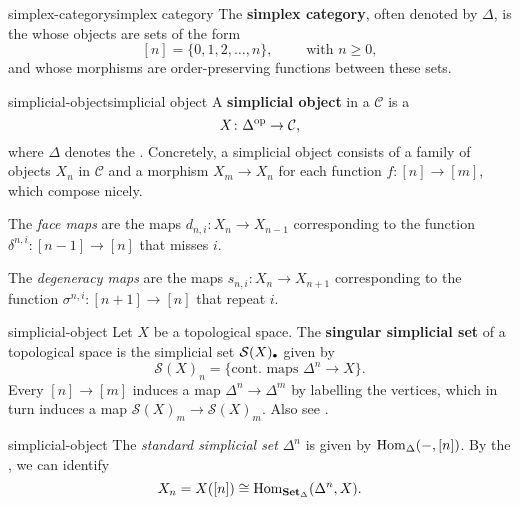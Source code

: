 \begin{topic}{simplex-category}{simplex category}
    The \textbf{simplex category}, often denoted by $\Delta$, is the  whose objects are sets of the form
    \[ [n] = \{ 0, 1, 2, \ldots, n \}, \qquad \text{ with } n \ge 0 , \]
    and whose morphisms are order-preserving functions between these sets.
\end{topic}

\begin{topic}{simplicial-object}{simplicial object}
    A \textbf{simplicial object} in a  $\mathcal{C}$ is a 
    \[ X \colon \Delta^\textup{op} \to \mathcal{C} , \]
    where $\Delta$ denotes the . Concretely, a simplicial object consists of a family of objects $X_n$ in $\mathcal{C}$ and a morphism $X_m \to X_n$ for each function $f \colon [n] \to [m]$, which compose nicely.
    
    The \textit{face maps} are the maps $d_{n, i} \colon X_n \to X_{n - 1}$ corresponding to the function $\delta^{n, i} \colon [n - 1] \to [n]$ that misses $i$.
    
    The \textit{degeneracy maps} are the maps $s_{n, i} \colon X_n \to X_{n + 1}$ corresponding to the function $\sigma^{n, i} \colon [n + 1] \to [n]$ that repeat $i$.
\end{topic}

\begin{example}{simplicial-object}
    Let $X$ be a topological space. The \textbf{singular simplicial set} of a topological space is the simplicial set $\mathcal{S}(X)_\bdot$ given by
    \[ \mathcal{S}(X)_n = \{ \text{cont. maps } \Delta^n \to X \} . \]
    Every $[n] \to [m]$ induces a map $\Delta^n \to \Delta^m$ by labelling the vertices, which in turn induces a map $\mathcal{S}(X)_m \to \mathcal{S}(X)_m$. Also see .
\end{example}

\begin{example}{simplicial-object}
    The \textit{standard simplicial set} $\Delta^n$ is given by $\operatorname{Hom}_\Delta(-, [n])$. By the , we can identify
    \[ X_n = X([n]) \cong \operatorname{Hom}_{\textbf{Set}_\Delta}(\Delta^n, X) . \]
\end{example}

